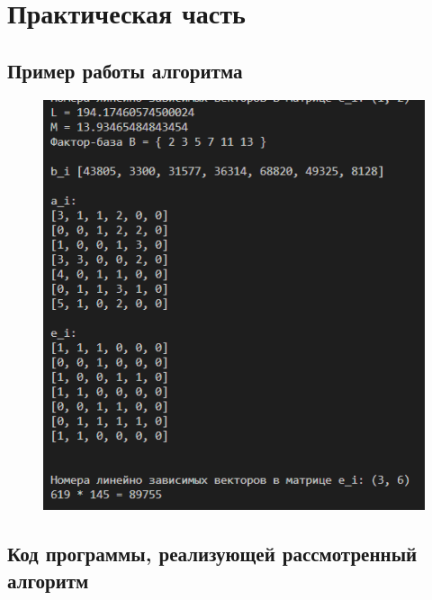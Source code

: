 \documentclass[bachelor, och, labwork]{shiza}
\begin{document}
\section{Практическая часть}
\subsection{Пример работы алгоритма}
\begin{figure}[H]
    \centering
    \includegraphics[width=1\textwidth]{pic1.png}
    \caption{}
\end{figure}

    \subsection{Код программы, реализующей рассмотренный алгоритм}
        \inputminted{python}{lab12.py}
\end{document}

